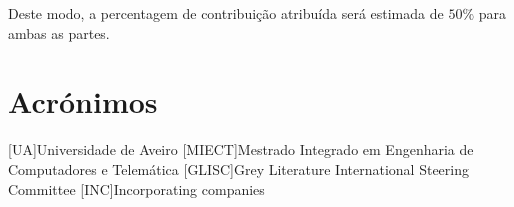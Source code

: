 \documentclass{report}
\begin{document}
 Deste modo, a percentagem de contribuição atribuída será estimada de $50\%$ para ambas as partes.


\chapter*{Acrónimos}
\begin{acronym}
[UA]{Universidade de Aveiro}
[MIECT]{Mestrado Integrado em Engenharia de Computadores e Telemática}
[GLISC]{Grey Literature International Steering Committee}
[INC]{Incorporating companies}
\end{acronym}


\printbibliography
\end{document}
